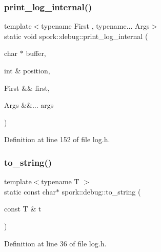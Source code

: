 \subsubsection{\texorpdfstring{print\+\_\+log\+\_\+internal()}{print\_log\_internal()}\hspace{0.1cm}{\footnotesize\ttfamily [2/2]}}
{\footnotesize\ttfamily template$<$typename First , typename... Args$>$ \\
static void spork\+::debug\+::print\+\_\+log\+\_\+internal (\begin{DoxyParamCaption}\item[{char $\ast$}]{buffer,  }\item[{int \&}]{position,  }\item[{First \&\&}]{first,  }\item[{Args \&\&...}]{args }\end{DoxyParamCaption})\hspace{0.3cm}{\ttfamily [static]}}



Definition at line 152 of file log.\+h.

\mbox{\label{namespacespork_1_1debug_afc2bf363eb52ab11d27418006ad8e210}} 
\subsubsection{\texorpdfstring{to\+\_\+string()}{to\_string()}\hspace{0.1cm}{\footnotesize\ttfamily [1/2]}}
{\footnotesize\ttfamily template$<$typename T $>$ \\
static const char$\ast$ spork\+::debug\+::to\+\_\+string (\begin{DoxyParamCaption}\item[{const T \&}]{t }\end{DoxyParamCaption})\hspace{0.3cm}{\ttfamily [static]}}



Definition at line 36 of file log.\+h.

\mbox{\label{namespacespork_1_1debug_a1365e215370f4a9ace42b9421077caf0}} 
